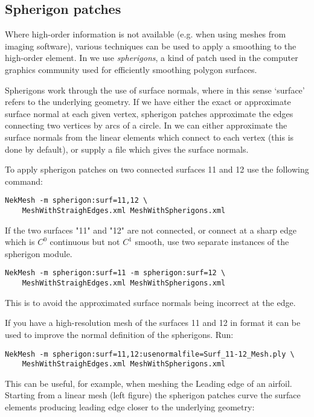 \subsection{Spherigon patches}

Where high-order information is not available (e.g. when using meshes from
imaging software), various techniques can be used to apply a smoothing to the
high-order element. In \mc we use \emph{spherigons}, a kind of patch used in the
computer graphics community used for efficiently smoothing polygon surfaces.

Spherigons work through the use of surface normals, where in this sense
`surface' refers to the underlying geometry. If we have either the exact or
approximate surface normal at each given vertex, spherigon patches approximate
the edges connecting two vertices by arcs of a circle. In \mc we can either
approximate the surface normals from the linear elements which connect to each
vertex (this is done by default), or supply a file which gives the surface
normals.

To apply spherigon patches on two connected surfaces 11 and 12 use the following
command:
%
\begin{lstlisting}[style=BashInputStyle]
NekMesh -m spherigon:surf=11,12 \
    MeshWithStraighEdges.xml MeshWithSpherigons.xml
\end{lstlisting}
%
If the two surfaces "11" and "12" are not connected, or connect at a sharp edge
which is $C^0$ continuous but not $C^1$ smooth, use two separate instances of
the spherigon module.
%
\begin{lstlisting}[style=BashInputStyle]
NekMesh -m spherigon:surf=11 -m spherigon:surf=12 \
    MeshWithStraighEdges.xml MeshWithSpherigons.xml
\end{lstlisting}
%
This is to avoid the approximated surface normals being incorrect at the edge.

If you have a high-resolution mesh of the surfaces 11 and 12 in \inltt{ply}
format it can be used to improve the normal definition of the spherigons. Run:
\begin{lstlisting}[style=BashInputStyle]
NekMesh -m spherigon:surf=11,12:usenormalfile=Surf_11-12_Mesh.ply \
    MeshWithStraighEdges.xml MeshWithSpherigons.xml
\end{lstlisting}

This can be useful, for example, when meshing the Leading edge of an
airfoil. Starting from a linear mesh (left figure) the spherigon patches curve
the surface elements producing leading edge closer to the underlying geometry:

